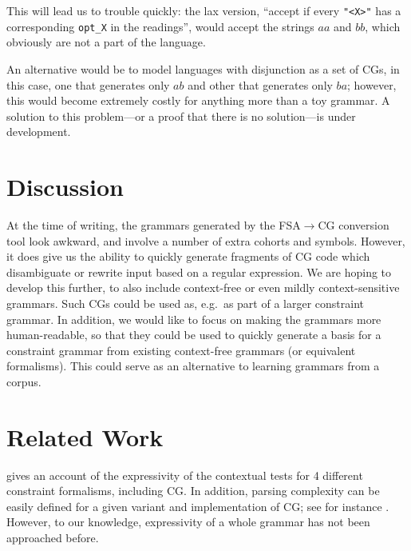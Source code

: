 \documentclass[11pt]{article}
\def\t#1{\texttt{#1}}
\begin{document}
This will lead us to trouble quickly: the lax version,
``accept if every \t{"<X>"} has a corresponding \t{opt\_X} in the readings'',
would accept the strings $aa$ and $bb$, which obviously are not a part of the
language.

An alternative would be to model languages with disjunction as a set of CGs,
in this case, one that generates only $ab$ and other that generates only $ba$;
however, this would become extremely costly for anything more than a toy grammar.
A solution to this problem---or a proof that there is no solution---is under
development.

\section{Discussion}

At the time of writing, the grammars generated by the FSA$\rightarrow$CG
conversion tool look awkward, and involve a number of extra cohorts and symbols.
However, it does give us the ability to quickly generate fragments of CG code
which disambiguate or rewrite input based on a regular expression.
We are hoping to develop this further, to also include context-free or even
mildly context-sensitive grammars.
Such CGs could be used as, e.g.\ as part of a larger constraint grammar.
In addition, we would like to focus on making the grammars more human-readable,
so that they could be used to quickly generate a basis for a constraint grammar
from existing context-free grammars (or equivalent formalisms).
This could serve as an alternative to learning grammars from a corpus.


\section{Related Work}
 gives an account of the expressivity of
the contextual tests for 4 different constraint formalisms, including CG. 
In addition, parsing complexity can be easily defined for a given variant and 
implementation of CG; see for instance .
However, to our knowledge, expressivity of a whole grammar has not been approached before.




\end{document}
